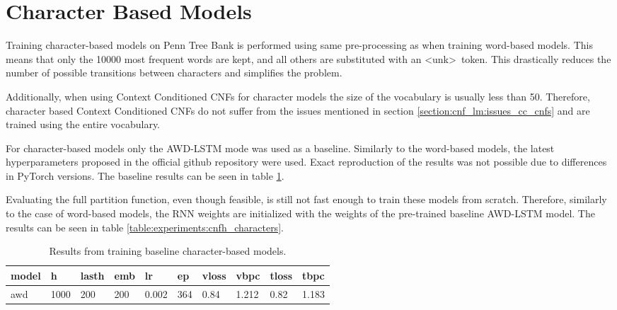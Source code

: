 \section{Character Based Models}

Training character-based models on Penn Tree Bank \citet{mikolov2011empirical} is performed using same pre-processing as when training word-based models. This means that only the 10000 most frequent words are kept, and all others are substituted with an \textless unk\textgreater \ token. This drastically reduces the number of possible transitions between characters and simplifies the problem.

Additionally, when using Context Conditioned CNFs for character models the size of the vocabulary is usually less than 50. Therefore, character based Context Conditioned CNFs do not suffer from the issues mentioned in section \ref{section:cnf_lm:issues_cc_cnfs} and are trained using the entire vocabulary.

For character-based models only the AWD-LSTM \citep{merity2017regularizing} mode was used as a baseline. Similarly to the word-based models, the latest hyperparameters proposed in the official github repository were used. Exact reproduction of the results was not possible due to differences in PyTorch versions. The baseline results can be seen in table \ref{table:experiments:baselines_char}.

Evaluating the full partition function, even though feasible, is still not fast enough to train these models from scratch. Therefore, similarly to the case of word-based models, the RNN weights are initialized with the weights of the pre-trained baseline AWD-LSTM model. The results can be seen in table \ref{table:experiments:cnfh_characters}.

\begin{table}
\centering
\caption{Results from training baseline character-based models.}
\begin{tabular}{|l|l|l|l|l|l|l|l|l|l|}
\hline
\textbf{model} & \textbf{h} & \textbf{lasth} & \textbf{emb} & \textbf{lr} & \textbf{ep} & \textbf{vloss} & \textbf{vbpc} & \textbf{tloss} & \textbf{tbpc} \\ \hline
awd       & 1000       & 200            & 200          & 0.002       & 364         & 0.84           & 1.212         & 0.82           & 1.183         \\ \hline
\end{tabular}
\label{table:experiments:baselines_char}
\end{table}

